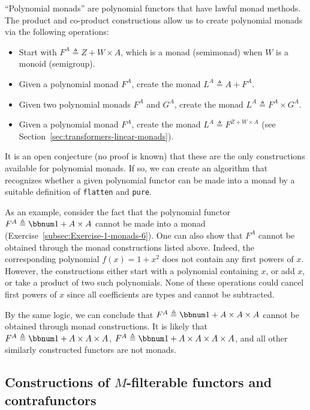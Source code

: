 \textsf{``}Polynomial monads\textsf{''} are polynomial functors that have lawful monad
methods. The product and co-product constructions allow us to create
polynomial monads via the following operations:
\begin{itemize}
\item Start with $F^{A}\triangleq Z+W\times A$, which is a monad (semimonad)
when $W$ is a monoid (semigroup).
\item Given a polynomial monad $F^{A}$, create the monad $L^{A}\triangleq A+F^{A}$.
\item Given two polynomial monads $F^{A}$ and $G^{A}$, create the monad
$L^{A}\triangleq F^{A}\times G^{A}$.
\item Given a polynomial monad $F^{A}$, create the monad $L^{A}\triangleq F^{Z+W\times A}$
(see Section~\ref{sec:transformers-linear-monads}).
\end{itemize}
It is an open conjecture (no proof is known) that these are the only
constructions available for polynomial monads. If so, we can create
an algorithm that recognizes whether a given polynomial functor can
be made into a monad by a suitable definition of \lstinline!flatten!
and \lstinline!pure!. 

As an example, consider the fact that the polynomial functor $F^{A}\triangleq\bbnum 1+A\times A$
cannot be made into a monad (Exercise~\ref{subsec:Exercise-1-monads-6}).
One can also show that $F^{A}$ cannot be obtained through the monad
constructions listed above. Indeed, the corresponding polynomial $f(x)=1+x^{2}$
does not contain any first powers of $x$. However, the constructions
either start with a polynomial containing $x$, or add $x$, or take
a product of two such polynomials. None of these operations could
cancel first powers of $x$ since all coefficients are types and cannot
be subtracted.

By the same logic, we can conclude that $F^{A}\triangleq\bbnum 1+A\times A\times A$
cannot be obtained through monad constructions. It is likely that
$F^{A}\triangleq\bbnum 1+A\times A\times A$, $F^{A}\triangleq\bbnum 1+A\times A\times A\times A$,
and all other similarly constructed functors are not monads.

\subsection{Constructions of $M$-filterable functors and contrafunctors\label{subsec:Constructions-of-M-filterables}}

